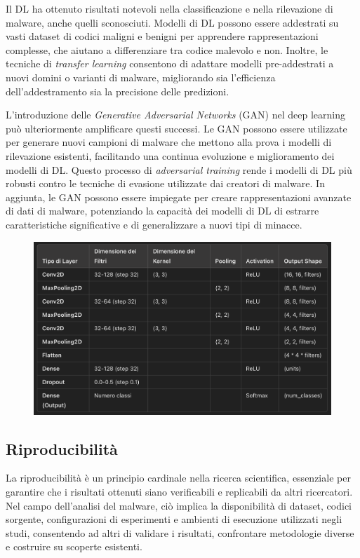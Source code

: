 Il DL ha ottenuto risultati notevoli nella classificazione e nella rilevazione di malware, anche quelli sconosciuti. Modelli di DL possono essere addestrati su vasti dataset di codici maligni e benigni per apprendere rappresentazioni complesse, che aiutano a differenziare tra codice malevolo e non. Inoltre, le tecniche di \emph{transfer learning} consentono di adattare modelli pre-addestrati a nuovi domini o varianti di malware, migliorando sia l'efficienza dell'addestramento sia la precisione delle predizioni.

L'introduzione delle \emph{Generative Adversarial Networks} (GAN) nel deep learning può ulteriormente amplificare questi successi. Le GAN possono essere utilizzate per generare nuovi campioni di malware che mettono alla prova i modelli di rilevazione esistenti, facilitando una continua evoluzione e miglioramento dei modelli di DL. Questo processo di \emph{adversarial training} rende i modelli di DL più robusti contro le tecniche di evasione utilizzate dai creatori di malware. In aggiunta, le GAN possono essere impiegate per creare rappresentazioni avanzate di dati di malware, potenziando la capacità dei modelli di DL di estrarre caratteristiche significative e di generalizzare a nuovi tipi di minacce.


\begin{figure}[ht]
    \centering
        \centering
        \includegraphics[width=0.8\linewidth]{images/cnn_architecture.png}
        \label{fig:cnn_architecture}
\end{figure}

\subsection{Riproducibilità}

La riproducibilità è un principio cardinale nella ricerca scientifica, essenziale per garantire che i risultati ottenuti siano verificabili e replicabili da altri ricercatori. Nel campo dell'analisi del malware, ciò implica la disponibilità di dataset, codici sorgente, configurazioni di esperimenti e ambienti di esecuzione utilizzati negli studi, consentendo ad altri di validare i risultati, confrontare metodologie diverse e costruire su scoperte esistenti.

